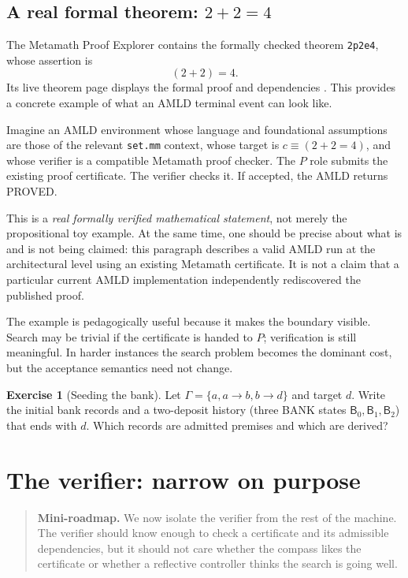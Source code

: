 \documentclass[11pt,openany]{book}
\theoremstyle{definition}
\newtheorem{exercise}[theorem]{Exercise}
\theoremstyle{remark}
\newenvironment{miniroadmap}{\begin{quote}\small\color{deepblue}\textbf{Mini-roadmap.} }{\end{quote}}
\newcommand{\Bank}{\mathsf{B}}
\begin{document}
\section{A real formal theorem: \texorpdfstring{$2+2=4$}{2+2=4}}
The Metamath Proof Explorer contains the formally checked theorem \texttt{2p2e4}, whose assertion is
\[
(2+2)=4.
\]
Its live theorem page displays the formal proof and dependencies \cite{Metamath2p2e4}. This provides a concrete example of what an AMLD terminal event can look like.

Imagine an AMLD environment whose language and foundational assumptions are those of the relevant \texttt{set.mm} context, whose target is $c\equiv(2+2=4)$, and whose verifier is a compatible Metamath proof checker. The $P$ role submits the existing proof certificate. The verifier checks it. If accepted, the AMLD returns \textsf{PROVED}.

This is a \emph{real formally verified mathematical statement}, not merely the propositional toy example. At the same time, one should be precise about what is and is not being claimed: this paragraph describes a valid AMLD run at the architectural level using an existing Metamath certificate. It is not a claim that a particular current AMLD implementation independently rediscovered the published proof.

The example is pedagogically useful because it makes the boundary visible. Search may be trivial if the certificate is handed to $P$; verification is still meaningful. In harder instances the search problem becomes the dominant cost, but the acceptance semantics need not change.

\begin{exercise}[Seeding the bank]\label{ex:seed}
Let $\Gamma=\{a, a\to b, b\to d\}$ and target $d$. Write the initial bank records and a two-deposit history (three BANK states $\Bank_0,\Bank_1,\Bank_2$) that ends with $d$. Which records are admitted premises and which are derived?
\end{exercise}

\chapter{The verifier: narrow on purpose}
\begin{miniroadmap}
We now isolate the verifier from the rest of the machine. The verifier should know enough to check a certificate and its admissible dependencies, but it should not care whether the compass likes the certificate or whether a reflective controller thinks the search is going well.
\end{miniroadmap}
\end{document}
